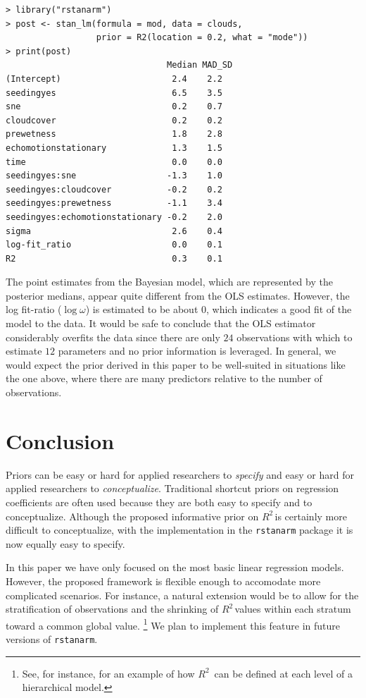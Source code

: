 \documentclass[11pt]{article}
\newcommand{\Rsq}{$R^2\,$}
\begin{document}
\vspace{.5cm}
\begin{lstlisting}[frame=lines]
> library("rstanarm")
> post <- stan_lm(formula = mod, data = clouds,
                  prior = R2(location = 0.2, what = "mode"))
> print(post)
                                Median MAD_SD
(Intercept)                      2.4    2.2
seedingyes                       6.5    3.5
sne                              0.2    0.7
cloudcover                       0.2    0.2
prewetness                       1.8    2.8
echomotionstationary             1.3    1.5
time                             0.0    0.0
seedingyes:sne                  -1.3    1.0
seedingyes:cloudcover           -0.2    0.2
seedingyes:prewetness           -1.1    3.4
seedingyes:echomotionstationary -0.2    2.0
sigma                            2.6    0.4
log-fit_ratio                    0.0    0.1
R2                               0.3    0.1
\end{lstlisting}
\vspace{.5cm}

The point estimates from the Bayesian model, which are represented by the
posterior medians, appear quite different from the OLS estimates. However, the
log fit-ratio ($\log{\omega}$) is estimated to be about $0$, which indicates a
good fit of the model to the data. It would be safe to conclude that the OLS
estimator considerably overfits the data since there are only $24$ observations
with which to estimate $12$ parameters and no prior information is leveraged. In
general, we would expect the prior derived in this paper to be well-suited in
situations like the one above, where there are many predictors relative to the
number of observations.


\section{Conclusion}

Priors can be easy or hard for applied researchers to \emph{specify} and easy or
hard for applied researchers to \emph{conceptualize}. Traditional shortcut
priors on regression coefficients are often used because they are both easy to
specify and to conceptualize. Although the proposed informative prior on \Rsq is
certainly more difficult to conceptualize, with the implementation in the
{\tt rstanarm} package it is now equally easy to specify.

In this paper we have only focused on the most basic linear regression models.
However, the proposed framework is flexible enough to accomodate more
complicated scenarios. For instance, a natural extension would be to allow for
the stratification of observations and the shrinking of \Rsq values within each
stratum toward a common global value.%
\footnote{See, for instance,  for an example of how \Rsq
can be defined at each level of a hierarchical model.}
We plan to implement this feature in future versions of {\tt rstanarm}.


\nocite{Rcore}
\nocite{HSAUR3-package}



\end{document}
